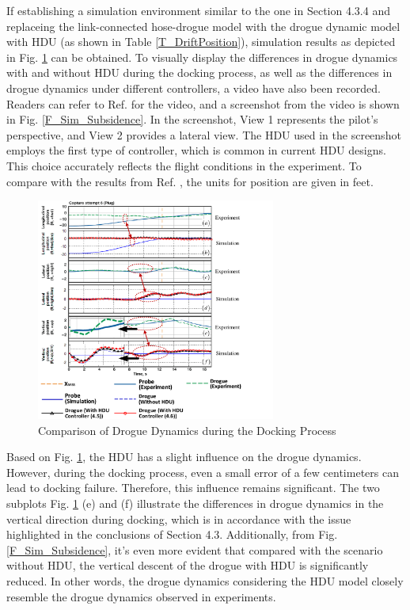 If establishing a simulation environment similar to the one in Section 4.3.4 and replaceing the link-connected hose-drogue model with the drogue dynamic model with HDU (as shown in Table \ref{T_DriftPosition}), simulation results as depicted in Fig. \ref{F_Comparison} can be obtained. To visually display the differences in drogue dynamics with and without HDU during the docking process, as well as the differences in drogue dynamics under different controllers, a video have also been recorded. Readers can refer to Ref. \cite{noauthor_drogue_nodate-1} for the video, and a screenshot from the video is shown in Fig. \ref{F_Sim_Subsidence}. In the screenshot, View 1 represents the pilot's perspective, and View 2 provides a lateral view. The HDU used in the screenshot employs the first type of controller, which is common in current HDU designs. This choice accurately reflects the flight conditions in the experiment. To compare with the results from Ref. \cite{dibley_autonomous_2007}, the units for position are given in feet.
\begin{figure}[th]
	\centering
	\includegraphics[width=0.7\textwidth]{Figures/Figs_Ch8/Fig12}
	\caption{Comparison of Drogue Dynamics during the Docking Process}\label{F_Comparison}
\end{figure} 
Based on Fig. \ref{F_Comparison}, the HDU has a slight influence on the drogue dynamics. However, during the docking process, even a small error of a few centimeters can lead to docking failure. Therefore, this influence remains significant. The two subplots Fig. \ref{F_Comparison} (e) and (f) illustrate the differences in drogue dynamics in the vertical direction during docking, which is in accordance with the issue highlighted in the conclusions of Section 4.3.
Additionally, from Fig. \ref{F_Sim_Subsidence}, it's even more evident that compared with the scenario without HDU, the vertical descent of the drogue with HDU is significantly reduced. In other words, the drogue dynamics considering the HDU model closely resemble the drogue dynamics observed in experiments.

